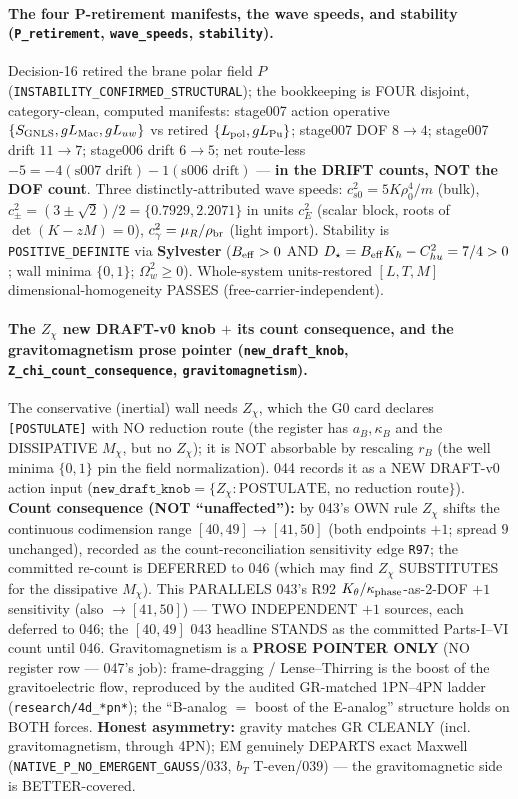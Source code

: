 \paragraph{The four P-retirement manifests, the wave speeds, and stability (\texttt{P\_retirement}, \texttt{wave\_speeds}, \texttt{stability}).}
Decision-16 retired the brane polar field \(P\) (\texttt{INSTABILITY\_CONFIRMED\_STRUCTURAL});
the bookkeeping is FOUR disjoint, category-clean, computed manifests: stage007 action
operative \(\{S_{\rm GNLS},gL_{\rm Mac},gL_{uw}\}\) vs retired \(\{L_{\rm pol},gL_{\rm
Pu}\}\); stage007 DOF \(8\to4\); stage007 drift \(11\to7\); stage006 drift \(6\to5\);
net route-less \(-5=-4(\text{s007 drift})-1(\text{s006 drift})\) --- \textbf{in the DRIFT
counts, NOT the DOF count}. Three distinctly-attributed wave speeds:
\(c_{s0}^2=5K\rho_0^4/m\) (bulk), \(c_\pm^2=(3\pm\sqrt2)/2=\{0.7929,2.2071\}\) in units
\(c_E^2\) (scalar block, roots of \(\det(K-zM)=0\)), \(c_\gamma^2=\mu_R/\rho_{\rm br}\)
(light import). Stability is \texttt{POSITIVE\_DEFINITE} via \textbf{Sylvester}
(\(B_{\rm eff}>0\) AND \(D_\star=B_{\rm eff}K_h-C_{hu}^2=7/4>0\); wall minima
\(\{0,1\}\); \(\Omega_w^2\ge0\)). Whole-system units-restored \([L,T,M]\)
dimensional-homogeneity PASSES (free-carrier-independent).

\paragraph{The \(Z_\chi\) new DRAFT-v0 knob \(+\) its count consequence, and the gravitomagnetism prose pointer (\texttt{new\_draft\_knob}, \texttt{Z\_chi\_count\_consequence}, \texttt{gravitomagnetism}).}
The conservative (inertial) wall needs \(Z_\chi\), which the G0 card declares
\texttt{[POSTULATE]} with NO reduction route (the register has \(a_B,\kappa_B\) and the
DISSIPATIVE \(M_\chi\), but no \(Z_\chi\)); it is NOT absorbable by rescaling \(r_B\)
(the well minima \(\{0,1\}\) pin the field normalization). 044 records it as a NEW
DRAFT-v0 action input (\(\texttt{new\_draft\_knob}=\{Z_\chi:\text{POSTULATE, no
reduction route}\}\)). \textbf{Count consequence (NOT ``unaffected''):} by 043's OWN
rule \(Z_\chi\) shifts the continuous codimension range \([40,49]\to[41,50]\) (both
endpoints \(+1\); spread \(9\) unchanged), recorded as the count-reconciliation
sensitivity edge \texttt{R97}; the committed re-count is DEFERRED to 046 (which may
find \(Z_\chi\) SUBSTITUTES for the dissipative \(M_\chi\)). This PARALLELS 043's R92
\(K_\theta/\kappa_{\rm phase}\)-as-2-DOF \(+1\) sensitivity (also \(\to[41,50]\)) --- TWO
INDEPENDENT \(+1\) sources, each deferred to 046; the \([40,49]\) 043 headline STANDS as
the committed Parts-I--VI count until 046. Gravitomagnetism is a \textbf{PROSE POINTER
ONLY} (NO register row --- 047's job): frame-dragging / Lense--Thirring is the boost of
the gravitoelectric flow, reproduced by the audited GR-matched 1PN--4PN ladder
(\texttt{research/4d\_*pn*}); the ``B-analog \(=\) boost of the E-analog'' structure holds
on BOTH forces. \textbf{Honest asymmetry:} gravity matches GR CLEANLY (incl.
gravitomagnetism, through 4PN); EM genuinely DEPARTS exact Maxwell
(\texttt{NATIVE\_P\_NO\_EMERGENT\_GAUSS}/033, \(b_T\) T-even/039) --- the gravitomagnetic
side is BETTER-covered.

